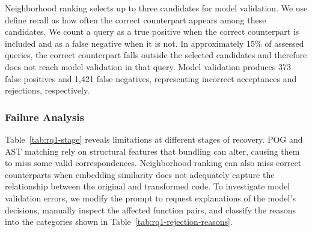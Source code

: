 Neighborhood ranking selects up to three candidates for model validation. We use define recall as how often the correct counterpart appears among these candidates. We count a query as a true positive when the correct counterpart is included and as a false negative when it is not. In approximately 15\% of assessed queries, the correct counterpart falls outside the selected candidates and therefore does not reach model validation in that query. Model validation produces 373 false positives and 1,421 false negatives, representing incorrect acceptances and rejections, respectively. 

\subsubsection{Failure Analysis}
Table~\ref{tab:rq1-stage} reveals limitations at different stages of recovery. POG and AST matching rely on structural features that bundling can alter, causing them to miss some valid correspondences. Neighborhood ranking can also miss correct counterparts when embedding similarity does not adequately capture the relationship between the original and transformed code. To investigate model validation errors, we modify the prompt to request explanations of the model's decisions, manually inspect the affected function pairs, and classify the reasons into the categories shown in Table~\ref{tab:rq1-rejection-reasons}.



